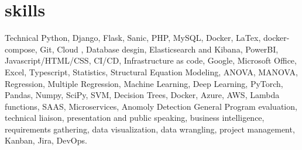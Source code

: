 \documentclass[]{twentysecondcv}
\begin{document}
\section{skills}
	\begin{twentyshort}
	\twentyitemshort
	{Technical}
	{Python, Django, Flask, Sanic, PHP, MySQL, Docker, LaTex, docker-compose, Git, Cloud , Database desgin, Elasticsearch and Kibana, PowerBI, Javascript/HTML/CSS, CI/CD, Infrastructure as code, Google, Microsoft Office, Excel, Typescript, Statistics, Structural Equation Modeling, ANOVA, MANOVA, Regression, Multiple Regression, Machine Learning, Deep Learning, PyTorch, Pandas, Numpy, SciPy, SVM, Decision Trees, Docker, Azure, AWS, Lambda functions, SAAS, Microservices, Anomoly Detection}
	\twentyitemshort
	{General}
	{Program evaluation, technical liaison, presentation and public speaking, business intelligence, requirements gathering, data visualization, data wrangling, project management, Kanban, Jira, DevOps.}
	\end{twentyshort}

\end{document}
